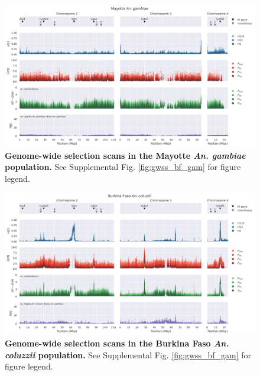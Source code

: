 \documentclass[a4paper,11pt,abstracton,hidelinks]{scrartcl}
\begin{document}
\begin{landscape}
\begin{figure}[t!]
	\begin{center}
		\includegraphics*[width=1\linewidth,center]{artwork/gwss_fr_gam_gw_ug_gam_gq_gam.png}
	\end{center}
	\caption{
	\textbf{Genome-wide selection scans in the Mayotte \textit{An. gambiae} population.} 
	See Supplemental Fig. \ref{fig:gwss_bf_gam} for figure legend.
	} 
	\label{fig:gwss_fr_gam}
\end{figure}


\begin{figure}[t!]
	\begin{center}
		\includegraphics*[width=1\linewidth,center]{artwork/gwss_bf_col_gw_ao_col_gq_gam.png}
	\end{center}
	\caption{
	\textbf{Genome-wide selection scans in the Burkina Faso \textit{An. coluzzii} population.} 
	See Supplemental Fig. \ref{fig:gwss_bf_gam} for figure legend.
	} 
	\label{fig:gwss_bf_col}
\end{figure}



\end{landscape}
\end{document}
